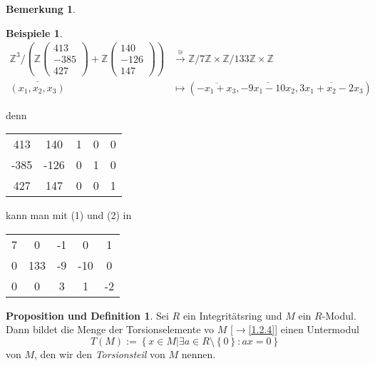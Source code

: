 \documentclass[
twoside=semi,
fontsize=12,
DIV=12, 
cleardoublepage=current,
leqno,
headings=optiontoheadandtoc, 
toc=idx
]{scrbook}
\newcommand{\Z}{\mathbb{Z}}
\newcommand{\brac}[1]{\left( #1 \right)}
\newcommand{\set}[1]{\left\{ #1 \right\}}
\theoremstyle{definition}
\newtheorem{bemerkung}[definition]{Bemerkung}
\newtheorem{beispiele}[definition]{Beispiele}
\newtheorem{prop-def}[definition]{Proposition und Definition}
\begin{document}
\begin{bemerkung}
		\begin{beispiele}\label{1.6.7}
			\begin{align*}
				\Z^3 / \brac{\Z\begin{pmatrix}
						413\\-385\\427
					\end{pmatrix} + \Z\begin{pmatrix}
						140\\-126\\147
				\end{pmatrix}} &\overset{\cong}{\to} \Z/7\Z \times \Z/133\Z \times \Z\\
				\overline{(x_1, x_2, x_3)} &\mapsto (\overline{-x_1+x_3}, \overline{-9x_1-10x_2},\overline{3x_1+x_2-2x_3})
			\end{align*}
			
			denn \begin{tabular}{|cc|ccc|}\hline
			413& 140 & 1 & 0 & 0\\
			-385& -126 & 0 & 1 & 0\\
			427& 147 & 0 & 0 & 1\\\hline
		\end{tabular} kann man mit (1) und (2) in \begin{tabular}{|cc|ccc|}\hline
			7& 0 & -1 & 0 & 1\\
			0& 133 & -9 &-10 & 0\\
			0& 0 & 3 & 1 & -2\\\hline
		\end{tabular}
		
		\end{beispiele}
	\end{bemerkung}

	\begin{prop-def}\label{1.6.8}
		Sei $R$ ein Integrit\"atsring und $M$ ein $R$-Modul. Dann bildet die Menge der Torsionselemente vo $M$ [$\to$\ref{1.2.4}] einen Untermodul
			\[T(M):= \set{x \in M| \exists a \in R \setminus \set{0}: ax = 0}\]
		von $M$, den wir den \emph{Torsionsteil} von $M$ nennen.
	\end{prop-def}
\end{document}

